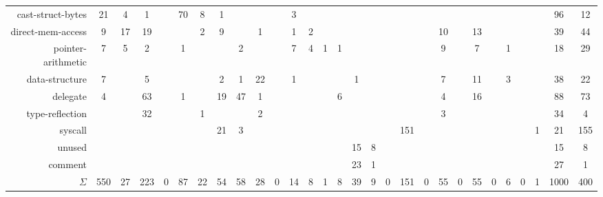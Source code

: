 \begin{table*}[!t]
\begin{adjustbox}{max width=\textwidth}
\begin{tabular}{r|cc|cc|cc|cc|cc|cc|cc|cc|cc|cc|cc|cc|cc|cc}
        \rowcolor{verylightgray}
                        cast-struct-bytes &   21 &   4 &    1 &    &   70 &   8 &    1 &    &     &    &    3 &    &     &    &     &    &     &    &     &    &     &    &     &    &     &    &     96 & 12 \\
                        direct-mem-access &    9 &  17 &   19 &    &     &   2 &    9 &    &    1 &    &    1 &   2 &     &    &     &    &     &    &     &  10 &     &  13 &     &    &     &    &     39 & 44 \\
        \rowcolor{verylightgray}
                       pointer-arithmetic &    7 &   5 &    2 &    &    1 &    &     &   2 &     &    &    7 &   4 &    1 &   1 &     &    &     &    &     &   9 &     &   7 &     &   1 &     &    &     18 & 29 \\
                           data-structure &    7 &    &    5 &    &     &    &    2 &   1 &   22 &    &    1 &    &     &    &    1 &    &     &    &     &   7 &     &  11 &     &   3 &     &    &     38 & 22 \\
        \rowcolor{verylightgray}
                                 delegate &    4 &    &   63 &    &    1 &    &   19 &  47 &    1 &    &     &    &     &   6 &     &    &     &    &     &   4 &     &  16 &     &    &     &    &     88 & 73 \\
                          type-reflection &     &    &   32 &    &     &   1 &     &    &    2 &    &     &    &     &    &     &    &     &    &     &   3 &     &    &     &    &     &    &      34 & 4 \\
        \rowcolor{verylightgray}
                                  syscall &     &    &     &    &     &    &   21 &   3 &     &    &     &    &     &    &     &    &     & 151 &     &    &     &    &     &    &     &   1 &    21 & 155 \\
                                   unused &     &    &     &    &     &    &     &    &     &    &     &    &     &    &   15 &   8 &     &    &     &    &     &    &     &    &     &    &      15 & 8 \\
        \rowcolor{verylightgray}
                                  comment &     &    &     &    &     &    &     &    &     &    &     &    &     &    &   23 &   1 &     &    &     &    &     &    &     &    &     &    &      27 & 1 \\ \hline
                                  $\Sigma$ &   550 & 27 &    223 & 0 &    87 & 22 &    54 & 58 &     28 & 0 &     14 & 8 &      1 & 8 &     39 & 9 &    0 & 151 &     0 & 55 &     0 & 55 &      0 & 6 &      0 & 1 &  1000 & 400 \\
    \end{tabular}
    \end{adjustbox}
\end{table*}